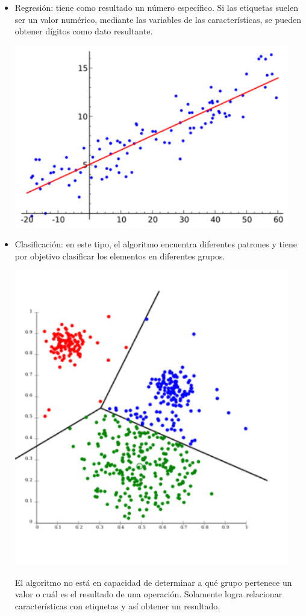\documentclass[12pt,a4paper]{report}
\begin{document}
\begin{itemize}
\item Regresión: tiene como resultado un número específico. Si las etiquetas suelen ser un valor numérico, mediante las variables de las características, se pueden obtener dígitos como dato resultante.

\includegraphics[width=12cm]{./images/4}\par\vspace{1cm}

\item Clasificación: en este tipo, el algoritmo encuentra diferentes patrones y tiene por objetivo clasificar los elementos en diferentes grupos.

\includegraphics[width=12cm]{./images/5}\par\vspace{1cm}

El algoritmo no está en capacidad de determinar a qué grupo pertenece un valor o cuál es el resultado de una operación. Solamente logra relacionar características con etiquetas y así obtener un resultado.
\end{itemize}
\end{document}
